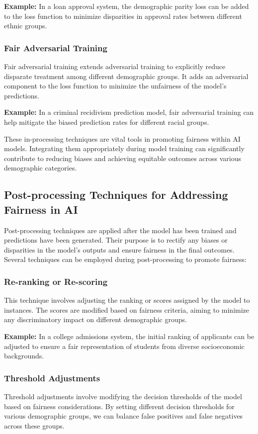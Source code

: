 \documentclass[12pt,a4paper,openright,twoside]{book}
\begin{document}
\textbf{Example:} In a loan approval system, the demographic parity loss can be added to the loss function to minimize disparities in approval rates between different ethnic groups.

\subsubsection{Fair Adversarial Training}
Fair adversarial training extends adversarial training to explicitly reduce disparate treatment among different demographic groups. It adds an adversarial component to the loss function to minimize the unfairness of the model's predictions.

\textbf{Example:} In a criminal recidivism prediction model, fair adversarial training can help mitigate the biased prediction rates for different racial groups.

These in-processing techniques are vital tools in promoting fairness within AI models. Integrating them appropriately during model training can significantly contribute to reducing biases and achieving equitable outcomes across various demographic categories.

\subsection{Post-processing Techniques for Addressing Fairness in AI}

Post-processing techniques are applied after the model has been trained and predictions have been generated. Their purpose is to rectify any biases or disparities in the model's outputs and ensure fairness in the final outcomes. Several techniques can be employed during post-processing to promote fairness:

\subsubsection{Re-ranking or Re-scoring}
This technique involves adjusting the ranking or scores assigned by the model to instances. The scores are modified based on fairness criteria, aiming to minimize any discriminatory impact on different demographic groups.

\textbf{Example:} In a college admissions system, the initial ranking of applicants can be adjusted to ensure a fair representation of students from diverse socioeconomic backgrounds.

\subsubsection{Threshold Adjustments}
Threshold adjustments involve modifying the decision thresholds of the model based on fairness considerations. By setting different decision thresholds for various demographic groups, we can balance false positives and false negatives across these groups.
\end{document}

